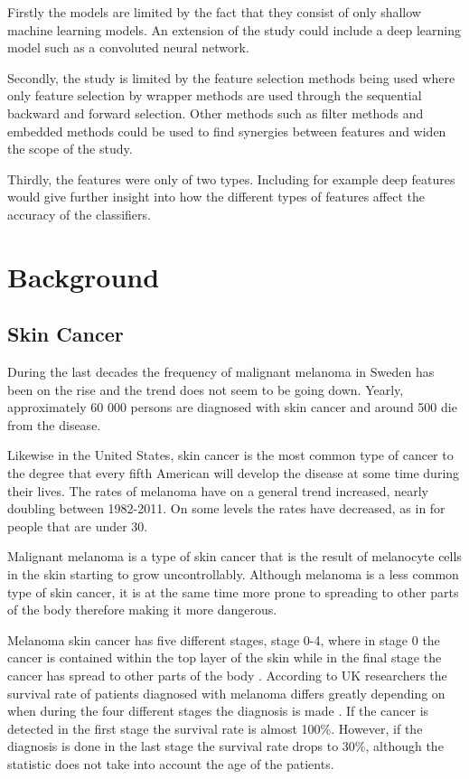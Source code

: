 \documentclass{kththesis}
\begin{document}
Firstly the models are limited by the fact that they consist of only shallow machine learning models. An extension of the study could include a deep learning model such as a convoluted neural network.

Secondly, the study is limited by the feature selection methods being used where only feature selection by wrapper methods are used through the sequential backward and forward selection. Other methods such as filter methods and embedded methods could be used to find synergies between features and widen the scope of the study.

Thirdly, the features were only of two types. Including for example deep features would give further insight into how the different types of features affect the accuracy of the classifiers.

\chapter{Background}

\section{Skin Cancer}



During the last decades the frequency of malignant melanoma in Sweden has been on the rise and the trend does not seem to be going down. Yearly, approximately 60 000 persons are diagnosed with skin cancer and around 500 die from the disease. \parencite{sverige-hudcancer}

Likewise in the United States, skin cancer is the most common type of cancer to the degree that every fifth American will develop the disease at some time during their lives. The rates of melanoma have on a general trend increased, nearly doubling between 1982-2011. On some levels the rates have decreased, as in for people that are under 30. \parencite{aad-skin-cancer}

Malignant melanoma is a type of skin cancer that is the result of melano\-cyte cells in the skin starting to grow uncontrollably.
Although melanoma is a less common type of skin cancer, it is at the same time more prone to spreading to other parts of the body therefore making it more dangerous. \parencite{aad-skin-cancer}

Melanoma skin cancer has five different stages, stage 0-4, where in stage 0 the cancer is contained within the top layer of the skin while in the final stage the cancer has spread to other parts of the body \parencite{cancerresearchuk-melanoma}.
According to UK researchers the survival rate of patients diagnosed with melanoma differs greatly depending on when during the four different stages the diagnosis is made \parencite{cancerresearchuk-survival}.
If the cancer is detected in the first stage the survival rate is almost 100\%. However, if the diagnosis is done in the last stage the survival rate drops to 30\%, although the statistic does not take into account the age of the patients. \parencite{cancerresearchuk-survival}
\end{document}
